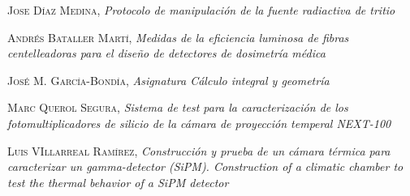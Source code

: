 \begin{thebibliography}{99}
 \textsc{Jose Díaz Medina},
\textit{Protocolo de manipulación de la fuente radiactiva de tritio}

 \textsc{Andrés Bataller Martí},
\textit{Medidas de la eficiencia luminosa de fibras centelleadoras para el diseño de detectores de dosimetría médica}

 \textsc{José M. García-Bondía},
\textit{Asignatura Cálculo integral y geometría}

 \textsc{Marc Querol Segura},
\textit{Sistema de test para la caracterización de los fotomultiplicadores de silicio de la cámara de proyección temperal NEXT-100}

 \textsc{Luis VIllarreal Ramírez},
\textit{Construcción y prueba de un cámara térmica para caracterizar un gamma-detector (SiPM). Construction of a climatic chamber to test the thermal behavior of a SiPM detector}
 
\end{thebibliography}
